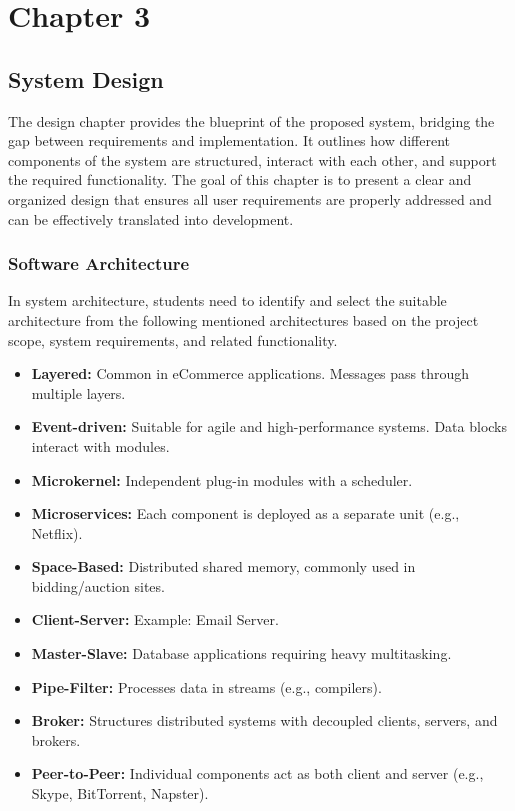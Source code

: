 


\setcounter{chapter}{3}
\setcounter{figure}{0}
\setcounter{table}{0}
\chapter*{Chapter 3}
\section{System Design}

The design chapter provides the blueprint of the proposed system, bridging the gap between requirements and implementation. It outlines how different components of the system are structured, interact with each other, and support the required functionality. The goal of this chapter is to present a clear and organized design that ensures all user requirements are properly addressed and can be effectively translated into development.


\subsection{Software Architecture}

In system architecture, students need to identify and select the suitable architecture from the following mentioned architectures based on the project scope, system requirements, and related functionality.

\begin{itemize}
    \item \textbf{Layered:} Common in eCommerce applications. Messages pass through multiple layers. 
    \item \textbf{Event-driven:} Suitable for agile and high-performance systems. Data blocks interact with modules.
    \item \textbf{Microkernel:} Independent plug-in modules with a scheduler.
    \item \textbf{Microservices:} Each component is deployed as a separate unit (e.g., Netflix).
    \item \textbf{Space-Based:} Distributed shared memory, commonly used in bidding/auction sites.
    \item \textbf{Client-Server:} Example: Email Server.
    \item \textbf{Master-Slave:} Database applications requiring heavy multitasking.
    \item \textbf{Pipe-Filter:} Processes data in streams (e.g., compilers).
    \item \textbf{Broker:} Structures distributed systems with decoupled clients, servers, and brokers.
    \item \textbf{Peer-to-Peer:} Individual components act as both client and server (e.g., Skype, BitTorrent, Napster).
\end{itemize}

